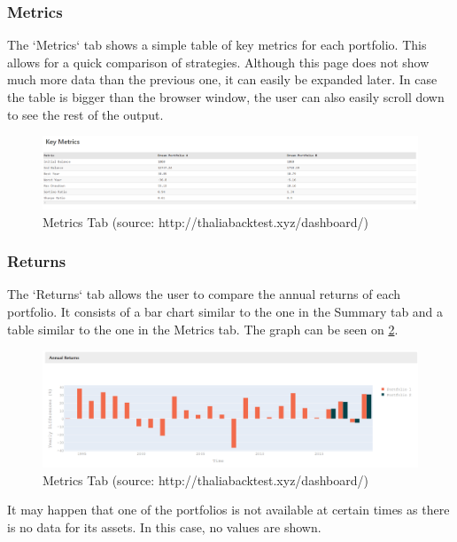 \documentclass[main.tex]{subfiles}
\begin{document}
\subsubsection{Metrics}

The `Metrics` tab shows a simple table of key metrics for each portfolio. This allows for a quick comparison of strategies. Although this page does not show much more data than the previous one, it can easily be expanded later. In case the table is bigger than the browser window, the user can also easily scroll down to see the rest of the output.


\begin{figure}[H]
   \centering
   \includegraphics[width=\textwidth]{08Appendices/081User/081Pictures/metrics.png}
   \caption{Metrics Tab (source: http://thaliabacktest.xyz/dashboard/)}
   \label{metrics}
\end{figure}


\subsubsection{Returns}

The `Returns` tab allows the user to compare the annual returns of each portfolio. It consists of a bar chart similar to the one in the Summary tab and a table similar to the one in the Metrics tab. The graph can be seen on \figurename{\ref{returns}}.

\begin{figure}[H]
   \centering
   \includegraphics[width=\textwidth]{08Appendices/081User/081Pictures/returns_graph.png}
   \caption{Metrics Tab (source: http://thaliabacktest.xyz/dashboard/)}
   \label{returns}
\end{figure}

It may happen that one of the portfolios is not available at certain times as there is no data for its assets. In this case, no values are shown.
\end{document}
